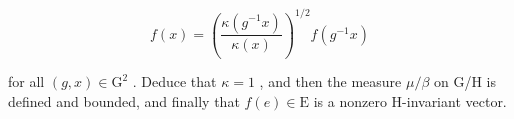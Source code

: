 \[
f (x) = \left(\frac {\kappa (g ^ {- 1} x)}{\kappa (x)}\right) ^ {1 / 2} f (g ^ {- 1} x)
\]

for all \((g, x) \in \mathrm{G}^{2}\) . Deduce that \(\kappa = 1\) , and then the measure \(\mu/\beta\) on G/H is defined and bounded, and finally that \(f(e) \in \mathrm{E}\) is a nonzero H-invariant vector.